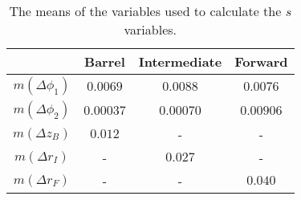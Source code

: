 \begin{table}[!hbt]
  \begin{center}
    \begin{tabular}{cccc}
      \hline
                        & Barrel    & Intermediate & Forward  \\
      \hline
      $m(\Delta\phi_1)$ &  $0.0069$ &     $0.0088$ &  $0.0076$ \\
      $m(\Delta\phi_2)$ & $0.00037$ &    $0.00070$ & $0.00906$ \\
      $m(\Delta z_B)$   &   $0.012$ &            - &         - \\
      $m(\Delta r_I)$   &         - &      $0.027$ &         - \\
      $m(\Delta r_F)$   &         - &            - &   $0.040$ \\
      \hline
    \end{tabular}
    \caption{The means of the variables used to calculate the $s$ variables.}
    \label{tab:s_parameters}
  \end{center}
\end{table}


